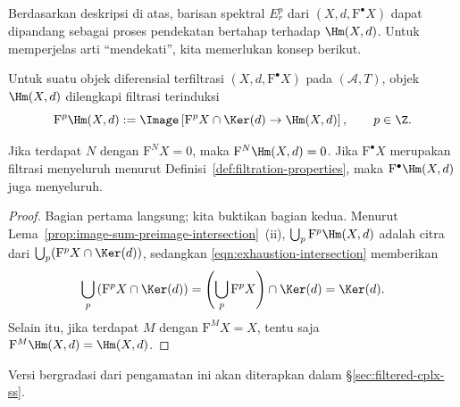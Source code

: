 Berdasarkan deskripsi di atas, barisan spektral $E_r^p$ dari
$(X,d,\mathrm{F}^\bullet X)$ dapat dipandang sebagai proses pendekatan bertahap
terhadap $\Hm(X,d)$. Untuk memperjelas arti ``mendekati'', kita
memerlukan konsep berikut.

\begin{definition}\label{def:induced-filtration-H}
	Untuk suatu objek diferensial terfiltrasi
	$(X,d,\mathrm{F}^\bullet X)$ pada $(\mathcal{A},T)$, objek $\Hm(X,d)$
	dilengkapi filtrasi terinduksi
	\[ \mathrm{F}^p\Hm(X,d):=
	\Image\left[\mathrm{F}^pX\cap\Ker(d)\to\Hm(X,d)\right],
	\qquad p\in\Z. \]
\end{definition}

\begin{lemma}\label{prop:induced-filtration-H}
	Jika terdapat $N$ dengan $\mathrm{F}^NX=0$, maka
	$\mathrm{F}^N\Hm(X,d)=0$. Jika $\mathrm{F}^\bullet X$ merupakan filtrasi
	menyeluruh menurut Definisi~\ref{def:filtration-properties}, maka
	$\mathrm{F}^\bullet\Hm(X,d)$ juga menyeluruh.
\end{lemma}
\begin{proof}
	Bagian pertama langsung; kita buktikan bagian kedua. Menurut
	Lema~\ref{prop:image-sum-preimage-intersection}~(ii),
	$\bigcup_p\mathrm{F}^p\Hm(X,d)$ adalah citra dari
	$\bigcup_p(\mathrm{F}^pX\cap\Ker(d))$, sedangkan
	\eqref{eqn:exhaustion-intersection} memberikan
	\[ \bigcup_p\left(\mathrm{F}^pX\cap\Ker(d)\right)
	=\left(\bigcup_p\mathrm{F}^pX\right)\cap\Ker(d)=\Ker(d). \]
	Selain itu, jika terdapat $M$ dengan $\mathrm{F}^MX=X$, tentu saja
	$\mathrm{F}^M\Hm(X,d)=\Hm(X,d)$.
\end{proof}

Versi bergradasi dari pengamatan ini akan diterapkan dalam
\S\ref{sec:filtered-cplx-ss}.

